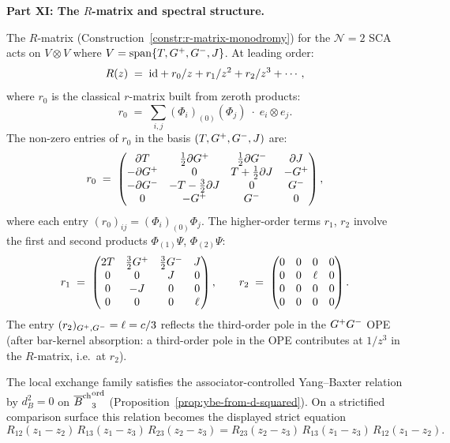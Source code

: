 \begin{computation}
\medskip
\noindent\textbf{Part XI: The $R$-matrix and spectral structure.}

The $R$-matrix
(Construction~\ref{constr:r-matrix-monodromy}) for the
$\mathcal N=2$ SCA acts on
$V\otimes V$ where $V = \operatorname{span}\{T,G^+,G^-,J\}$.
At leading order:
\begin{equation}\label{eq:r-matrix-n2-sca}
R(z) \;=\; \mathrm{id} + r_0/z + r_1/z^2 + r_2/z^3 + \cdots,
\end{equation}
where $r_0$ is the classical $r$-matrix built from zeroth
products:
\begin{equation}\label{eq:classical-r-n2}
r_0 \;=\; \sum_{i,j} (\Phi_i)_{(0)}(\Phi_j)\;\cdot\;
e_i\otimes e_j.
\end{equation}
The non-zero entries of $r_0$ in the basis
$(T,G^+,G^-,J)$ are:
\[
r_0 \;=\;
\begin{pmatrix}
\partial T & \frac12\partial G^+ & \frac12\partial G^- & \partial J \\
-\partial G^+ & 0 & T+\frac12\partial J & -G^+ \\
-\partial G^- & -T-\frac32\partial J & 0 & G^- \\
0 & -G^+ & G^- & 0
\end{pmatrix},
\]
where each entry $(r_0)_{ij} = (\Phi_i)_{(0)}\Phi_j$.
The higher-order terms $r_1$, $r_2$ involve the first and
second products $\Phi_{(1)}\Psi$, $\Phi_{(2)}\Psi$:
\begin{equation}\label{eq:r1-n2}
r_1 \;=\;
\begin{pmatrix}
2T & \frac32G^+ & \frac32G^- & J \\
0 & 0 & J & 0 \\
0 & -J & 0 & 0 \\
0 & 0 & 0 & \ell
\end{pmatrix},
\qquad
r_2 \;=\;
\begin{pmatrix}
0 & 0 & 0 & 0 \\
0 & 0 & \ell & 0 \\
0 & 0 & 0 & 0 \\
0 & 0 & 0 & 0
\end{pmatrix}.
\end{equation}
The entry $(r_2)_{G^+,G^-} = \ell = c/3$ reflects the
third-order pole in the $G^+G^-$ OPE (after bar-kernel
absorption: a third-order pole in the OPE contributes
at $1/z^3$ in the $R$-matrix, i.e.\ at $r_2$).

The local exchange family satisfies the associator-controlled
Yang--Baxter relation by \(d_B^2=0\) on
${\overline{B}^{\mathrm{ch}}}^{\mathrm{ord}}_3$
(Proposition~\ref{prop:ybe-from-d-squared}). On a strictified
comparison surface this relation becomes the displayed strict equation
\[
R_{12}(z_1{-}z_2)\,R_{13}(z_1{-}z_3)\,R_{23}(z_2{-}z_3)
= R_{23}(z_2{-}z_3)\,R_{13}(z_1{-}z_3)\,R_{12}(z_1{-}z_2).
\]


\end{computation}
